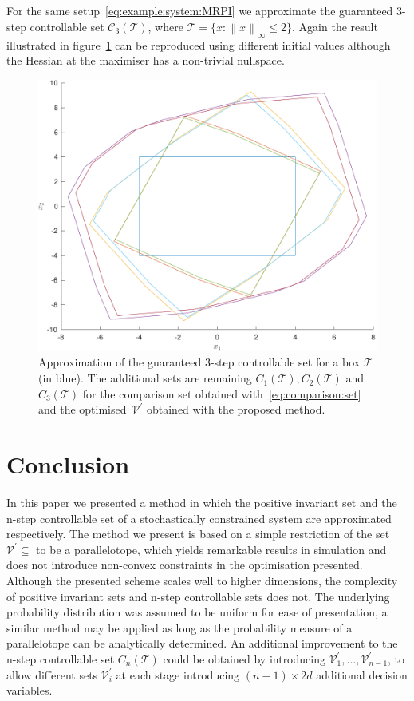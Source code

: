 \documentclass{ifacconf}
\providecommand{\norm}[1]{\left\|#1\right\|}
\providecommand{\C}{\mathcal C}
\providecommand{\V}{\mathcal V}
\providecommand{\T}{\mathcal T}
\begin{document}
For the same setup~\eqref{eq:example:system:MRPI} we approximate the guaranteed 3-step controllable set $\C_3(\T)$, where $\T=\{x:\norm{x}_\infty\leq 2\}$.
%
Again the result illustrated in figure~\ref{fig:n:step:controllable:set} can be reproduced using different initial values although the Hessian at the maximiser has a non-trivial nullspace.
%
\begin{figure}
\includegraphics[width=.95\linewidth]{NStepSetOptimised.pdf}
\caption{Approximation of the guaranteed 3-step controllable set for a box $\T$ (in blue). The additional sets are remaining $C_1(\T),C_2(\T)$ and $C_3(\T)$ for the comparison set obtained with~\eqref{eq:comparison:set} and the optimised~$\V^\prime$ obtained with the proposed method.}
\label{fig:n:step:controllable:set}
\end{figure}



\section{Conclusion}\label{sec:conclusion}
%
%
In this paper we presented a method in which the positive invariant set and the n-step controllable set of a stochastically constrained system are approximated respectively.
%
The method we present is based on a simple restriction of the set $\V^\prime\subseteq$ to be a parallelotope, which yields remarkable results in simulation and does not introduce non-convex constraints in the optimisation presented.
%
Although the presented scheme scales well to higher dimensions, the complexity of positive invariant sets and n-step controllable sets does not.
%
The underlying probability distribution was assumed to be uniform for ease of presentation, a similar method may be applied as long as the probability measure of a parallelotope can be analytically determined.
%
An additional improvement to the n-step controllable set $C_n(\T)$ could be obtained by introducing $\V_1^\prime,\dots,\V_{n-1}^\prime$, to allow different sets $\V_i^\prime$ at each stage introducing $(n-1)\times 2d$ additional decision variables.




\end{document}
